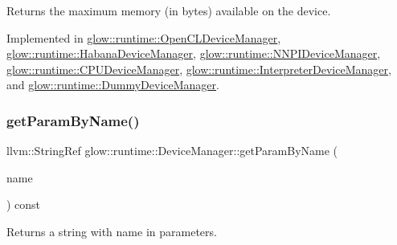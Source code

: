 \begin{DoxyReturn}{Returns}
the maximum memory (in bytes) available on the device. 
\end{DoxyReturn}


Implemented in \hyperlink{classglow_1_1runtime_1_1_open_c_l_device_manager_aec918b4dd4a7a0cd926844cf225db306}{glow\+::runtime\+::\+Open\+C\+L\+Device\+Manager}, \hyperlink{classglow_1_1runtime_1_1_habana_device_manager_a2e8ddfc33d1a4f482bcd1f9a5e4e5350}{glow\+::runtime\+::\+Habana\+Device\+Manager}, \hyperlink{classglow_1_1runtime_1_1_n_n_p_i_device_manager_ae71ea73f150f1c35a735ba06efa871db}{glow\+::runtime\+::\+N\+N\+P\+I\+Device\+Manager}, \hyperlink{classglow_1_1runtime_1_1_c_p_u_device_manager_a865758926a01983e4867ce0c2583ec3a}{glow\+::runtime\+::\+C\+P\+U\+Device\+Manager}, \hyperlink{classglow_1_1runtime_1_1_interpreter_device_manager_a6b7d0747cee65050a106437a55997036}{glow\+::runtime\+::\+Interpreter\+Device\+Manager}, and \hyperlink{classglow_1_1runtime_1_1_dummy_device_manager_a58bc8e9d658c8b173d27527a4251e5e0}{glow\+::runtime\+::\+Dummy\+Device\+Manager}.

\mbox{\label{classglow_1_1runtime_1_1_device_manager_a839a6b19dd88cbfee2c758d92ac4e1e0}} 
\subsubsection{\texorpdfstring{get\+Param\+By\+Name()}{getParamByName()}}
{\footnotesize\ttfamily llvm\+::\+String\+Ref glow\+::runtime\+::\+Device\+Manager\+::get\+Param\+By\+Name (\begin{DoxyParamCaption}\item[{llvm\+::\+String\+Ref}]{name }\end{DoxyParamCaption}) const\hspace{0.3cm}{\ttfamily [inline]}}

\begin{DoxyReturn}{Returns}
a string with {\ttfamily name} in parameters. 
\end{DoxyReturn}
\mbox{\label{classglow_1_1runtime_1_1_device_manager_ae9bba4abda9cb6aa1359a69e942feb22}} 
